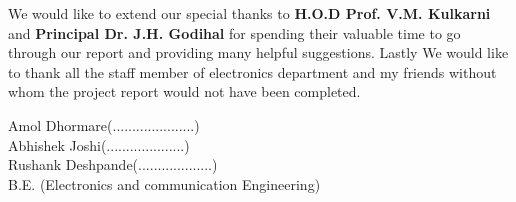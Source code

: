 \documentclass[12pt]{article}
\begin{document}
	We would like to extend our special thanks to \textbf{H.O.D Prof. V.M. Kulkarni} and \textbf{Principal Dr. J.H. Godihal} for spending their valuable time to go through our report and providing many helpful suggestions. Lastly We would like to thank all the staff member of electronics department and my friends without whom the project report would not have been completed.\\


	 \begin{flushright}
	 	Amol Dhormare(.....................) \\
	 	Abhishek Joshi(....................) \\
	 	Rushank Deshpande(...................) \\
	 	B.E. (Electronics and communication Engineering) \\
	 \end{flushright}
\end{document}
